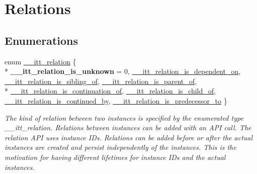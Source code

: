 \hypertarget{group__relations}{}\section{Relations}
\label{group__relations}
\subsection*{Enumerations}
\begin{DoxyCompactItemize}
\item 
enum \hyperlink{group__relations_ga2f588e0d778ac0cca7cc0b64cfb1bdca}{\+\_\+\+\_\+itt\+\_\+relation} \{ \\*
{\bfseries \+\_\+\+\_\+itt\+\_\+relation\+\_\+is\+\_\+unknown} = 0, 
\hyperlink{group__relations_gga2f588e0d778ac0cca7cc0b64cfb1bdcaa04baff009ada30040481b41a79f4f593}{\+\_\+\+\_\+itt\+\_\+relation\+\_\+is\+\_\+dependent\+\_\+on}, 
\hyperlink{group__relations_gga2f588e0d778ac0cca7cc0b64cfb1bdcaab47399cff08b5c6b90fd5db7d06f46c2}{\+\_\+\+\_\+itt\+\_\+relation\+\_\+is\+\_\+sibling\+\_\+of}, 
\hyperlink{group__relations_gga2f588e0d778ac0cca7cc0b64cfb1bdcaa157629a13cd4b3fda5a0ebaab75fe707}{\+\_\+\+\_\+itt\+\_\+relation\+\_\+is\+\_\+parent\+\_\+of}, 
\\*
\hyperlink{group__relations_gga2f588e0d778ac0cca7cc0b64cfb1bdcaa1e41b50db9c794d31bdcd594993b4b6f}{\+\_\+\+\_\+itt\+\_\+relation\+\_\+is\+\_\+continuation\+\_\+of}, 
\hyperlink{group__relations_gga2f588e0d778ac0cca7cc0b64cfb1bdcaa0996403dd9c42c69163e2c6321d5cf37}{\+\_\+\+\_\+itt\+\_\+relation\+\_\+is\+\_\+child\+\_\+of}, 
\hyperlink{group__relations_gga2f588e0d778ac0cca7cc0b64cfb1bdcaa4d343a796c9e120c638b451d9ce7c001}{\+\_\+\+\_\+itt\+\_\+relation\+\_\+is\+\_\+continued\+\_\+by}, 
\hyperlink{group__relations_gga2f588e0d778ac0cca7cc0b64cfb1bdcaae91984fad33dfb746f08f0db95df3279}{\+\_\+\+\_\+itt\+\_\+relation\+\_\+is\+\_\+predecessor\+\_\+to}
 \}\begin{DoxyCompactList}\small\item\em The kind of relation between two instances is specified by the enumerated type \+\_\+\+\_\+itt\+\_\+relation. Relations between instances can be added with an A\+P\+I call. The relation A\+P\+I uses instance I\+Ds. Relations can be added before or after the actual instances are created and persist independently of the instances. This is the motivation for having different lifetimes for instance I\+Ds and the actual instances. \end{DoxyCompactList}
\end{DoxyCompactItemize}
